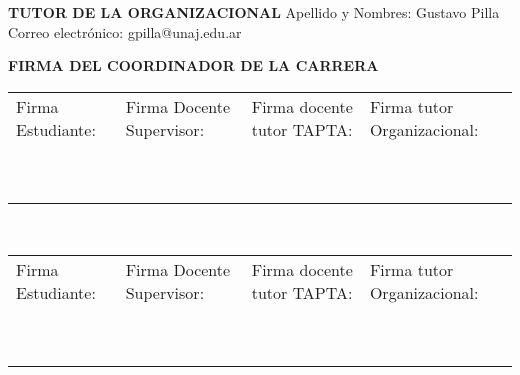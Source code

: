 \documentclass[12pt]{article}
\begin{document}
\begin{framed}
\noindent\textbf{TUTOR DE LA ORGANIZACIONAL}\newline
Apellido y Nombres: Gustavo Pilla \newline
Correo electr\'{o}nico: gpilla@unaj.edu.ar
\end{framed}

\begin{framed}
    \noindent\textbf{FIRMA DEL COORDINADOR DE LA CARRERA}
\end{framed}
\vfill
\noindent\begin{tabular}{|P{3.3cm}|P{3.3cm}|P{3.3cm}|P{3.3cm}|}
\hline
Firma Estudiante: & Firma Docente Supervisor: & Firma docente tutor TAPTA: & Firma tutor Organizacional: \\
~ & ~ & ~ & ~ \\
~ & ~ & ~ & ~ \\
\hline
\end{tabular}
\newpage


\newpage~
\vfill
\noindent\begin{tabular}{|P{3.3cm}|P{3.3cm}|P{3.3cm}|P{3.3cm}|}
\hline
Firma Estudiante: & Firma Docente Supervisor: & Firma docente tutor TAPTA: & Firma tutor Organizacional: \\
~ & ~ & ~ & ~ \\
~ & ~ & ~ & ~ \\
\hline
\end{tabular}
\end{document}
